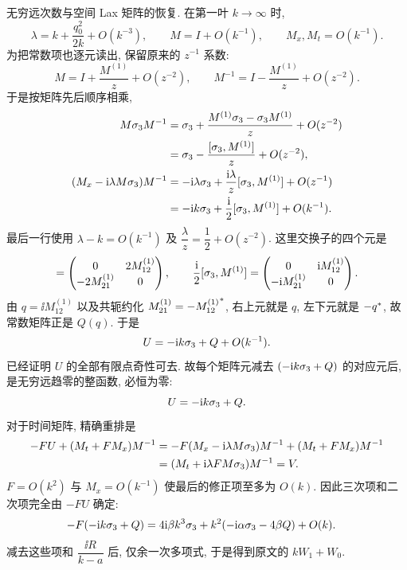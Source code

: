 \par\smallskip\noindent 无穷远次数与空间 Lax 矩阵的恢复.\quad
在第一叶 $k\to\infty$ 时,
\begin{equation*}
\lambda=k+\dfrac{q_0^2}{2k}+O(k^{-3}),\qquad
M=I+O(k^{-1}),\qquad M_x,M_t=O(k^{-1}).
\end{equation*}
为把常数项也逐元读出, 保留原来的 $z^{-1}$ 系数:
\begin{equation*}
M=I+\dfrac{M^{(1)}}{z}+O(z^{-2}),\qquad
M^{-1}=I-\dfrac{M^{(1)}}{z}+O(z^{-2}).
\end{equation*}
于是按矩阵先后顺序相乘,
\begin{align*}
M\sigma_3 M^{-1}
&=\sigma_3+\dfrac{M^{(1)}\sigma_3-\sigma_3 M^{(1)}}{z}+O(z^{-2})\\
&=\sigma_3-\dfrac{[\sigma_3,M^{(1)}]}{z}+O(z^{-2}),\\
(M_x-\mathrm{i}\lambda M\sigma_3)M^{-1}
&=-\mathrm{i}\lambda\sigma_3+\dfrac{\mathrm{i}\lambda}{z}[\sigma_3,M^{(1)}]+O(z^{-1})\\
&=-\mathrm{i} k\sigma_3+\dfrac{\mathrm{i}}{2}[\sigma_3,M^{(1)}]+O(k^{-1}).
\end{align*}
最后一行使用 $\lambda-k=O(k^{-1})$ 及 $\dfrac{\lambda}{z}=\dfrac{1}{2}+O(z^{-2})$.
这里交换子的四个元是
\begin{equation*}
[\sg,M^{(1)}]
=\begin{pmatrix}0&2M^{(1)}_{12}\\-2M^{(1)}_{21}&0\end{pmatrix},\qquad
\dfrac{\ii}{2}[\sg,M^{(1)}]
=\begin{pmatrix}0&\ii M^{(1)}_{12}\\-\ii M^{(1)}_{21}&0\end{pmatrix}.
\end{equation*}
由 $q=\ii M^{(1)}_{12}$ 以及共轭约化
$M^{(1)}_{21}=-{M^{(1)}_{12}}^{*}$, 右上元就是 $q$,
左下元就是 $-{q}^{*}$, 故常数矩阵正是 $Q(q)$.
于是
\begin{equation*}
 U=-\mathrm{i} k\sigma_3+Q+O(k^{-1}).
\end{equation*}
已经证明 $ U$ 的全部有限点奇性可去.
故每个矩阵元减去 $(-\mathrm{i} k\sigma_3+Q)$ 的对应元后,
是无穷远趋零的整函数, 必恒为零:
\begin{equation*}
 U=-\mathrm{i} k\sigma_3+Q.
\end{equation*}
对于时间矩阵, 精确重排是
\begin{equation*}
\begin{aligned}
-F U+(M_t+FM_x)M^{-1}
&=-F(M_x-\mathrm{i}\lambda M\sigma_3)M^{-1}
+(M_t+FM_x)M^{-1}\\
&=(M_t+\mathrm{i}\lambda F M\sigma_3)M^{-1}= V.
\end{aligned}
\end{equation*}
$F=O(k^2)$ 与 $M_x=O(k^{-1})$ 使最后的修正项至多为 $O(k)$.
因此三次项和二次项完全由 $-F U$ 确定:
\begin{equation*}
\begin{aligned}
-F(-\mathrm{i} k\sigma_3+Q)
={}&4\mathrm{i}\beta k^3\sigma_3
+k^2(-\mathrm{i}\alpha\sigma_3-4\beta Q)+O(k).
\end{aligned}
\end{equation*}
减去这些项和 $\dfrac{\ii R}{k-a}$ 后, 仅余一次多项式,
于是得到原文的 $kW_1+W_0$.

